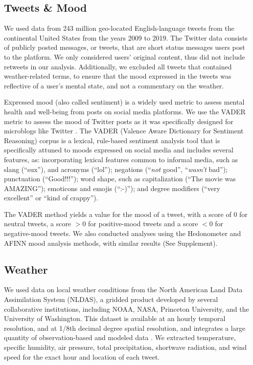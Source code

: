 \documentclass[9pt,twocolumn,twoside,lineno]{pnas-new}
\begin{document}
\subsection*{Tweets \& Mood}
We used data from 243 million geo-located English-language tweets from the continental United States from the years 2009 to 2019. The Twitter data consists of publicly posted messages, or tweets, that are short status messages users post to the platform. We only considered users’ original content, thus did not include retweets in our analysis. Additionally, we excluded all tweets that contained weather-related terms, to ensure that the mood expressed in the tweets was reflective of a user's mental state, and not a commentary on the weather.

Expressed mood (also called sentiment) is a widely used metric to assess mental health and well-being from posts on social media platforms. We use the VADER metric to assess the mood of Twitter posts as it was specifically designed for microblogs like Twitter \cite{hutto2014vader}. The VADER (Valence Aware Dictionary for Sentiment Reasoning) corpus \cite{gilbert_vader_2014} is a lexical, rule-based sentiment analysis tool that is specifically attuned to moods expressed on social media and includes several features, as: incorporating lexical features common to informal media, such as slang (``sux''), and acronyms (``lol''); negations (``\textit{not} good'', ``\textit{wasn't} bad''); punctuation (``Good!!!''); word shape, such as capitalization (``The movie was AMAZING''); emoticons and emojis (``:-)''); and degree modifiers (``very excellent'' or ``kind of crappy'').

The VADER method yields a value for the mood of a tweet, with a score of 0 for neutral tweets, a score $> 0$ for positive-mood tweets and a score $< 0$ for negative-mood tweets. We also conducted analyses using the Hedonometer and AFINN mood analysis methods, with similar results (See Supplement).

\subsection*{Weather}
We used data on local weather conditions from the North American Land Data Assimilation System (NLDAS), a gridded product developed by several collaborative institutions, including NOAA, NASA, Princeton University, and the University of Washington. This dataset is available at an hourly temporal resolution, and at 1/8th decimal degree spatial resolution, and integrates a large quantity of observation-based and modeled data \cite{xia_continental-scale_2012}. We extracted temperature, specific humidity, air pressure, total precipitation, shortwave radiation, and wind speed for the exact hour and location of each tweet. 
\end{document}
